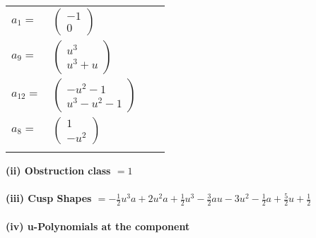 \documentclass[1p]{elsarticle_modified}
\theoremstyle{definition}
\begin{document}
\begin{tabular}{m{7pt} m{180pt} m{7pt} m{180pt} }
\flushright $a_{1}=$&$\begin{pmatrix}-1\\0\end{pmatrix}$ \\
\flushright $a_{9}=$&$\begin{pmatrix}u^3\\u^3+u\end{pmatrix}$ \\
\flushright $a_{12}=$&$\begin{pmatrix}- u^2-1\\u^3- u^2-1\end{pmatrix}$ \\
\flushright $a_{8}=$&$\begin{pmatrix}1\\- u^2\end{pmatrix}$\\&\end{tabular}
\flushleft \textbf{(ii) Obstruction class $= 1$}\\~\\
\flushleft \textbf{(iii) Cusp Shapes $= -\frac{1}{2} u^3 a+2 u^2 a+\frac{1}{2} u^3-\frac{3}{2} a u-3 u^2-\frac{1}{2} a+\frac{5}{2} u+\frac{1}{2}$}\\~\\
\newpage\renewcommand{\arraystretch}{1}
\flushleft \textbf{(iv) u-Polynomials at the component}\newline \\
\end{document}
